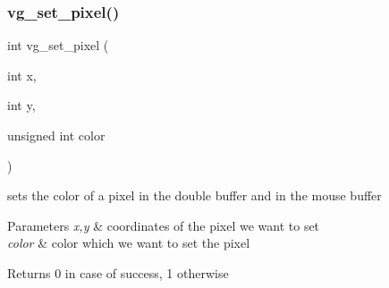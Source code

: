 \subsubsection{\texorpdfstring{vg\+\_\+set\+\_\+pixel()}{vg\_set\_pixel()}}
{\footnotesize\ttfamily int vg\+\_\+set\+\_\+pixel (\begin{DoxyParamCaption}\item[{int}]{x,  }\item[{int}]{y,  }\item[{unsigned int}]{color }\end{DoxyParamCaption})}



sets the color of a pixel in the double buffer and in the mouse buffer 


\begin{DoxyParams}{Parameters}
{\em x,y} & coordinates of the pixel we want to set \\
\hline
{\em color} & color which we want to set the pixel \\
\hline
\end{DoxyParams}
\begin{DoxyReturn}{Returns}
0 in case of success, 1 otherwise 
\end{DoxyReturn}
